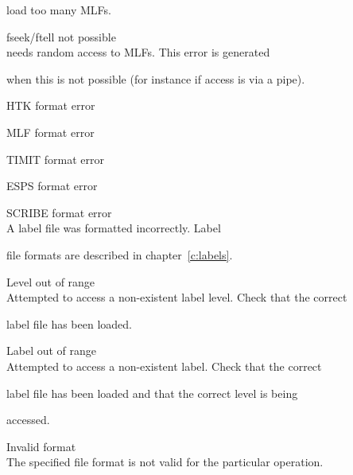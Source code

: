 \begin{itemize}
\begin{itemize}
        load too many MLFs.





    fseek/ftell not possible\\


         needs random access to MLFs.  This error is generated


        when this is not possible (for instance if access is via a pipe).





    HTK format error


    MLF format error


    TIMIT format error


 ESPS format error


    SCRIBE format error\\


        A label file was formatted incorrectly.  Label


        file formats are described in chapter~\ref{c:labels}.





    Level out of range\\


        Attempted to access a non-existent label level.  Check that the correct


        label file has been loaded.





    Label out of range\\


        Attempted to access a non-existent label.  Check that the correct


        label file has been loaded and that the correct level is being 


        accessed.





    Invalid format\\


        The specified file format is not valid for the particular operation.





\end{itemize}






\end{itemize}
